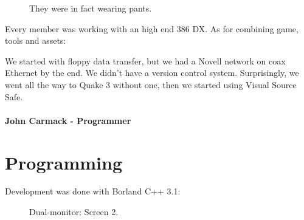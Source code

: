 \documentclass[book.tex]{subfiles}
\begin{document}
\begin{figure}[H]
\centering
\caption{They were in fact wearing pants.}
\label{fig:id_team_1993}
\end{figure}

Every member was working with an high end 386 DX. As for combining game, tools and assets:\\

 \begin{fancyquotes}
We started with floppy data transfer, but we had a Novell network on coax Ethernet by the end. We didn't have a version control system.  Surprisingly, we went all the way to Quake 3 without one, then we started using Visual Source Safe.\\
 \\
\textbf{John Carmack - Programmer}
\end{fancyquotes}
\section{Programming}

Development was done with Borland C++ 3.1:\\
\begin{figure}[H]
\centering
\caption{Dual-monitor: Screen 2.}
\label{fig:dm1}
\end{figure}
\end{document}
